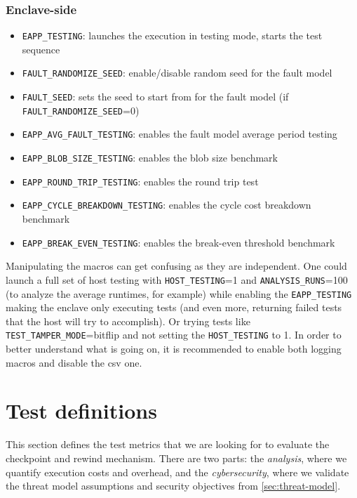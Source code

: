 \documentclass[11pt,a4paper]{report}
\begin{document}
\subsubsection{Enclave-side}
\begin{itemize}
    \item \verb|EAPP_TESTING|: launches the execution in testing mode, starts the test sequence
    \item \verb|FAULT_RANDOMIZE_SEED|: enable/disable random seed for the fault model
    \item \verb|FAULT_SEED|: sets the seed to start from for the fault model (if\\ \verb|FAULT_RANDOMIZE_SEED|=0)
    \item \verb|EAPP_AVG_FAULT_TESTING|: enables the fault model average period testing
    \item \verb|EAPP_BLOB_SIZE_TESTING|: enables the blob size benchmark
    \item \verb|EAPP_ROUND_TRIP_TESTING|: enables the round trip test
    \item \verb|EAPP_CYCLE_BREAKDOWN_TESTING|: enables the cycle cost breakdown benchmark
    \item \verb|EAPP_BREAK_EVEN_TESTING|: enables the break-even threshold benchmark
\end{itemize}
Manipulating the macros can get confusing as they are independent. 
One could launch a full set of host testing with \verb|HOST_TESTING|=1 and \verb|ANALYSIS_RUNS|=100 (to analyze the average runtimes, for example) while enabling the \verb|EAPP_TESTING| making the enclave only executing tests (and even more, returning failed tests that the host will try to accomplish).
Or trying tests like \verb|TEST_TAMPER_MODE|=bitflip and not setting the \verb|HOST_TESTING| to 1.
In order to better understand what is going on, it is recommended to enable both logging macros and disable the csv one.


\section{Test definitions}
This section defines the test metrics that we are looking for to evaluate the checkpoint and rewind mechanism.
There are two parts: the \textit{analysis}, where we quantify execution costs and overhead, and the \textit{cybersecurity}, where we validate the threat model assumptions and security objectives from \ref{sec:threat-model}.
\\
\end{document}
